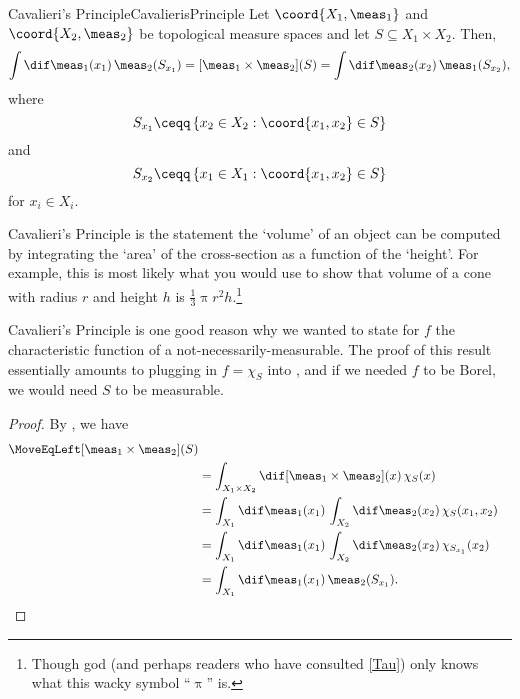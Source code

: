 \begin{crl}{Cavalieri's Principle}{CavalierisPrinciple}
Let $\coord{X_1,\meas _1}$ and $\coord{X_2,\meas _2}$ be topological measure spaces and let $S\subseteq X_1\times X_2$.  Then,
{\tiny
\begin{equation}\label{eqn5.2.279}
\int \dif \meas _1(x_1)\, \meas _2(S_{x_1})=[\meas _1\times \meas _2](S)=\int \dif \meas _2(x_2)\, \meas _1(S_{x_2}),
\end{equation}
}
where
\begin{equation}\label{eqn5.2.291}
S_{x_1}\ceqq \left\{ x_2\in X_2:\coord{x_1,x_2}\in S\right\}
\end{equation}
and
\begin{equation}
S_{x_2}\ceqq \left\{ x_1\in X_1:\coord{x_1,x_2}\in S\right\}
\end{equation}
for $x_i\in X_i$.
\begin{rmk}
Cavalieri's Principle is the statement the `volume' of an object can be computed by integrating the `area' of the cross-section as a function of the `height'.  For example, this is most likely what you would use to show that volume of a cone with radius $r$ and height $h$ is $\frac{1}{3}\uppi r^2h$.\footnote{Though god (and perhaps readers who have consulted \cref{Tau}) only knows what this wacky symbol ``$\uppi$'' is.}
\end{rmk}
\begin{rmk}
Cavalieri's Principle is one good reason why we wanted to state  for $f$ the characteristic function of a not-necessarily-measurable.  The proof of this result essentially amounts to plugging in $f=\chi _S$ into , and if we needed $f$ to be Borel, we would need $S$ to be measurable.
\end{rmk}
\begin{proof}
By , we have
\begin{equation}
\begin{split}
\MoveEqLeft \relax
[\meas _1\times \meas _2](S) \\
& =\int _{X_1\times X_2}\dif [\meas _1\times \meas _2](x)\, \chi _S(x) \\
& =\int _{X_1}\dif \meas _1(x_1)\, \int _{X_2}\dif \meas _2(x_2)\, \chi _S(x_1,x_2) \\
& =\int _{X_1}\dif \meas _1(x_1)\, \int _{X_2}\dif \meas _2(x_2)\, \chi _{S_{x_1}}(x_2) \\
& =\int _{X_1}\dif \meas _1(x_1)\, \meas _2(S_{x_1}).
\end{split}
\end{equation}
\end{proof}
\end{crl}

